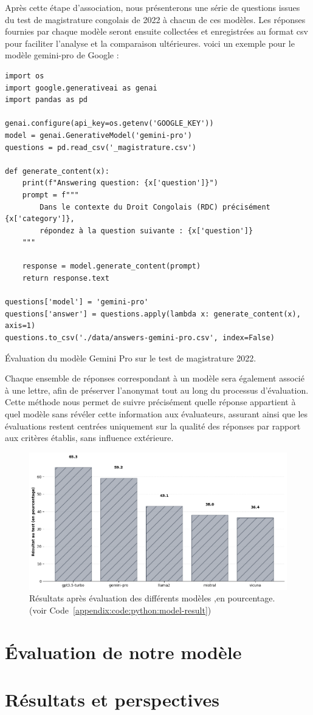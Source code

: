 Après cette étape d'association, nous présenterons une série de questions issues du test de magistrature congolais de 2022 à chacun de ces modèles. Les réponses fournies par chaque modèle seront ensuite collectées et enregistrées au format \ac{csv} pour faciliter l'analyse et la comparaison ultérieures. voici un exemple pour le modèle gemini-pro \cite{geminiteam2023gemini} de Google :

\begin{listing}[!ht]
\begin{verbatim}
import os
import google.generativeai as genai
import pandas as pd

genai.configure(api_key=os.getenv('GOOGLE_KEY'))
model = genai.GenerativeModel('gemini-pro')
questions = pd.read_csv('_magistrature.csv')

def generate_content(x):
    print(f"Answering question: {x['question']}")
    prompt = f"""
        Dans le contexte du Droit Congolais (RDC) précisément {x['category']},
        répondez à la question suivante : {x['question']}
    """

    response = model.generate_content(prompt)
    return response.text

questions['model'] = 'gemini-pro'
questions['answer'] = questions.apply(lambda x: generate_content(x), axis=1)
questions.to_csv('./data/answers-gemini-pro.csv', index=False)
\end{verbatim}
\caption{Évaluation du modèle Gemini Pro sur le test de magistrature 2022.}
\label{appendix:code:python:gemini-pro-evaluation}
\end{listing}

Chaque ensemble de réponses correspondant à un modèle sera également associé à une lettre, afin de préserver l'anonymat tout au long du processus d'évaluation. Cette méthode nous permet de suivre précisément quelle réponse appartient à quel modèle sans révéler cette information aux évaluateurs, assurant ainsi que les évaluations restent centrées uniquement sur la qualité des réponses par rapport aux critères établis, sans influence extérieure. 

\begin{figure}[H]
    \centering
    \includegraphics[width=15cm]{gfx/fig-model-result.png}
    \caption{Résultats après évaluation des différents modèles ,en pourcentage. (voir Code~\ref{appendix:code:python:model-result})}
    \label{fig:model-result}
\end{figure}


\newpage
\newpage
\section{Évaluation de notre modèle}


\section{Résultats et perspectives}
